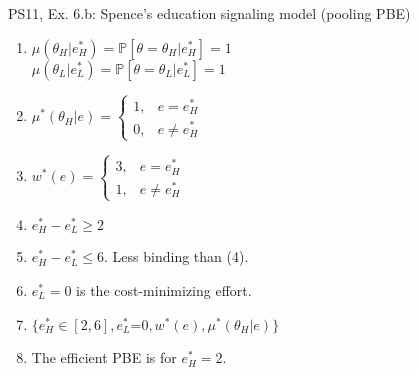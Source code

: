 \begin{frame}{PS11, Ex. 6.b: Spence’s education signaling model (pooling PBE)}
\begin{multicols}{2}
\begin{enumerate}
        \item $\mu\left(\theta_H|e_H^*\right)=
               \mathbb{P}\left[\theta=\theta_H|e_H^*\right]=1$\\
              $\mu\left(\theta_L|e_L^*\right)=
               \mathbb{P}\left[\theta=\theta_L|e_L^*\right]=1$
        \item $\mu^*(\theta_H|e)=\left\{\begin{array}{ll}
                  1, & e = e_H^* \\
                  0, & e \neq e_H^*
               \end{array}\right.$
        \item $w^*(e)=\left\{\begin{array}{ll}
                  3, & e = e_H^* \\
                  1, & e \neq e_H^*
               \end{array}\right.$
        \item $e_H^*-e_L^*\geq2$
        \item $e_H^*-e_L^*\leq6$. Less binding than (4).
        \item $e_L^*=0$ is the cost-minimizing effort.
        \item $\{e_H^*\in[2,6],e_L^*$=$0,w^*(e),\mu^*(\theta_H|e)\}$
        \item The efficient PBE is for $e_H^*=2$.
      \end{enumerate}
    \end{multicols}
    \vfill\null
\end{frame}
